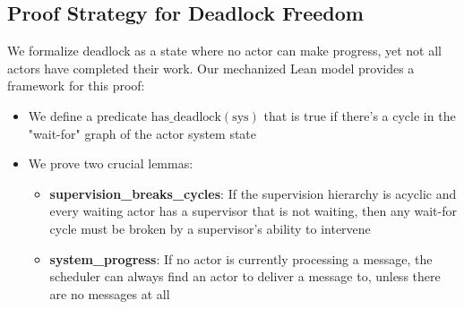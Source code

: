 \subsection{Proof Strategy for Deadlock Freedom}

We formalize deadlock as a state where no actor can make progress, yet not all actors have completed their work. Our mechanized Lean model provides a framework for this proof:

\begin{itemize}
\item We define a predicate $\text{has\_deadlock}(\text{sys})$ that is true if there's a cycle in the "wait-for" graph of the actor system state
\item We prove two crucial lemmas:
\begin{itemize}
\item \textbf{supervision\_breaks\_cycles}: If the supervision hierarchy is acyclic and every waiting actor has a supervisor that is not waiting, then any wait-for cycle must be broken by a supervisor's ability to intervene
\item \textbf{system\_progress}: If no actor is currently processing a message, the scheduler can always find an actor to deliver a message to, unless there are no messages at all
\end{itemize}
\end{itemize}

